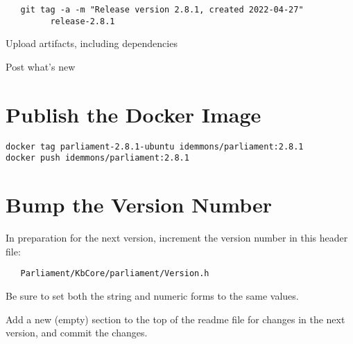 \documentclass[12pt,letterpaper,draft]{article}
\begin{document}
\begin{verbatim}
   git tag -a -m "Release version 2.8.1, created 2022-04-27"
         release-2.8.1
\end{verbatim}

Upload artifacts, including dependencies

Post what's new



\section{Publish the Docker Image}

\begin{verbatim}
docker tag parliament-2.8.1-ubuntu idemmons/parliament:2.8.1
docker push idemmons/parliament:2.8.1
\end{verbatim}



\section{Bump the Version Number}

In preparation for the next version, increment the version number in this header file:
\begin{verbatim}
   Parliament/KbCore/parliament/Version.h
\end{verbatim}
Be sure to set both the string and numeric forms to the same values.

Add a new (empty) section to the top of the readme file for changes in the next version, and commit the changes.
\end{document}
